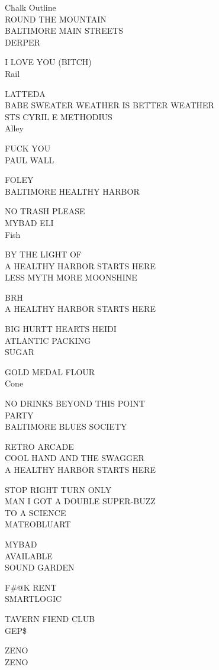\documentclass[10pt,letterpaper]{article}
\begin{document}
Chalk Outline\\
ROUND THE MOUNTAIN\\
BALTIMORE MAIN STREETS\\
DERPER

I LOVE YOU (BITCH)\\
Rail

LATTEDA\\
BABE SWEATER WEATHER IS BETTER WEATHER\\
STS CYRIL E METHODIUS\\
Alley

FUCK YOU\\
PAUL WALL

FOLEY\\
BALTIMORE HEALTHY HARBOR

NO TRASH PLEASE\\
MYBAD ELI\\
Fish

BY THE LIGHT OF\\
A HEALTHY HARBOR STARTS HERE\\
LESS MYTH MORE MOONSHINE

BRH\\
A HEALTHY HARBOR STARTS HERE

BIG HURTT HEARTS HEIDI\\
ATLANTIC PACKING\\
SUGAR

GOLD MEDAL FLOUR\\
Cone

NO DRINKS BEYOND THIS POINT\\
PARTY\\
BALTIMORE BLUES SOCIETY

RETRO ARCADE\\
COOL HAND AND THE SWAGGER\\
A HEALTHY HARBOR STARTS HERE

STOP RIGHT TURN ONLY\\
MAN I GOT A DOUBLE SUPER{-}BUZZ\\
TO A SCIENCE\\
MATEOBLUART

MYBAD\\
AVAILABLE\\
SOUND GARDEN

F\#@K RENT\\
SMARTLOGIC

TAVERN FIEND CLUB\\
GEP\$

ZENO\\
ZENO
\end{document}
